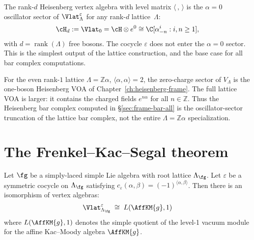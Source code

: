 \begin{example}
\label{ex:lattice:heisenberg}
The rank-$d$ Heisenberg vertex algebra with level matrix
$\langle\,,\,\rangle$ is the $\alpha = 0$ oscillator sector of
$\Vlat_\Lambda^\varepsilon$ for any rank-$d$ lattice~$\Lambda$:
\[
\cH_d := \Vlat_0 = \cH \otimes e^0 \cong \C[\alpha^i_{-n} : i, n \geq 1],
\]
with $d = \operatorname{rank}(\Lambda)$ free bosons. The cocycle
$\varepsilon$ does not enter the $\alpha = 0$ sector. This is the
simplest output of the lattice construction, and the base case for all
bar complex computations.
\end{example}

\begin{remark}\label{rem:lattice-heisenberg-frame}
For the even rank-$1$ lattice
$\Lambda=\mathbb Z\alpha$, $\langle\alpha,\alpha\rangle=2$,
the zero-charge sector of $V_\Lambda$ is the one-boson Heisenberg
VOA of Chapter~\ref{ch:heisenberg-frame}. The full lattice VOA is
larger: it contains the charged fields $e^{n\alpha}$ for all
$n\in\mathbb Z$. Thus the Heisenberg bar complex computed in
\S\ref{sec:frame-bar-all} is the oscillator-sector truncation of the
lattice bar complex, not the entire $\Lambda=\mathbb Z\alpha$
specialization.
\end{remark}


\section{The Frenkel--Kac--Segal theorem}
\label{sec:lattice:frenkel-kac}

\begin{theorem}\label{thm:lattice:frenkel-kac}
Let $\fg$ be a simply-laced simple Lie algebra with root lattice
$\Lambda_\fg$. Let $\varepsilon$ be a symmetric cocycle on $\Lambda_\fg$
satisfying
$c_\varepsilon(\alpha,\beta)=(-1)^{\langle\alpha,\beta\rangle}$.
Then there is an isomorphism of
vertex algebras:
\begin{equation}\label{eq:lattice:frenkel-kac}
\Vlat_{\Lambda_\fg}^\varepsilon
\;\cong\; L(\AffKM{g}, 1)
\end{equation}
where $L(\AffKM{g}, 1)$ denotes the simple quotient of the level-1
vacuum module for the affine Kac--Moody algebra $\AffKM{g}$.
\end{theorem}

